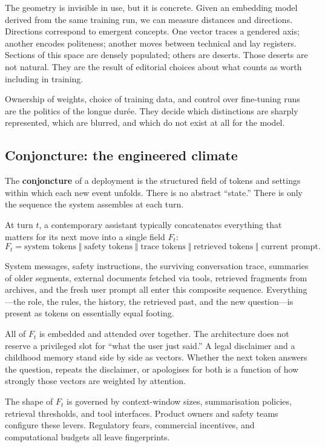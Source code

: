 The geometry is invisible in use, but it is concrete. Given an embedding model derived from the same training run, we can measure distances and directions. Directions correspond to emergent concepts. One vector traces a gendered axis; another encodes politeness; another moves between technical and lay registers. Sections of this space are densely populated; others are deserts. Those deserts are not natural. They are the result of editorial choices about what counts as worth including in training.

Ownership of weights, choice of training data, and control over fine-tuning runs are the politics of the longue dur\'ee. They decide which distinctions are sharply represented, which are blurred, and which do not exist at all for the model.

\subsection{Conjoncture: the engineered climate}

The \textbf{conjoncture} of a deployment is the structured field of tokens and settings within which each new event unfolds. There is no abstract ``state.'' There is only the sequence the system assembles at each turn.

At turn $t$, a contemporary assistant typically concatenates everything that matters for its next move into a single field $F_t$:
\[
F_t = \text{system tokens} \;\Vert\; \text{safety tokens} \;\Vert\; \text{trace tokens} \;\Vert\; \text{retrieved tokens} \;\Vert\; \text{current prompt}.
\]

System messages, safety instructions, the surviving conversation trace, summaries of older segments, external documents fetched via tools, retrieved fragments from archives, and the fresh user prompt all enter this composite sequence. Everything---the role, the rules, the history, the retrieved past, and the new question---is present as tokens on essentially equal footing.

All of $F_t$ is embedded and attended over together. The architecture does not reserve a privileged slot for ``what the user just said.'' A legal disclaimer and a childhood memory stand side by side as vectors. Whether the next token answers the question, repeats the disclaimer, or apologises for both is a function of how strongly those vectors are weighted by attention.

The shape of $F_t$ is governed by context-window sizes, summarisation policies, retrieval thresholds, and tool interfaces. Product owners and safety teams configure these levers. Regulatory fears, commercial incentives, and computational budgets all leave fingerprints.

